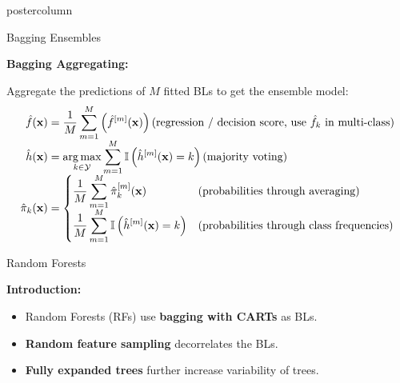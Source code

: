 \documentclass{beamer}
\begin{document}
\begin{frame}[fragile]{}
\begin{columns}
\begin{column}{.31\textwidth}
\begin{beamercolorbox}[center]{postercolumn}
\begin{minipage}{.98\textwidth}
{\begin{myblock}{Bagging Ensembles}
            \begin{codebox}
              \textbf{Bagging Aggregating: }
              \end{codebox}

            Aggregate the predictions of $M$ fitted BLs to get the ensemble model:
            \begin{align*}
              \hat{f}(\mathbf{x}) &= \frac{1}{M} \sum\limits_{m=1}^M \left(\hat{f}^{[m]}(\mathbf{x})\right) \text{(regression / decision score, use $\hat{f}_k$ in multi-class)} \\[-1ex]
              \hat{h}(\mathbf{x}) &= \mathop{\mathrm{arg\,max}}_{k \in \mathcal{Y}} \sum\limits_{m=1}^M \mathbb{I} \left(\hat{h}^{[m]}(\mathbf{x}) = k\right) \text{(majority voting)} \\[-1ex]
            \hat \pi_{k}(\mathbf{x}) &=
            \left\{
            \begin{aligned}
            & \frac{1}{M} \sum\limits_{m=1}^M \hat{\pi}_{k}^{[m]}(\mathbf{x}) && \text{(probabilities through averaging)} \\[-1ex]
            & \frac{1}{M} \sum\limits_{m=1}^M \mathbb{I} \left(\hat{h}^{[m]}(\mathbf{x}) = k \right) && \text{(probabilities through class frequencies)}
            \end{aligned}
            \right.
            \end{align*}

             \end{myblock}

             \begin{myblock}{Random Forests}
              \begin{codebox} \textbf{Introduction: }
              \end{codebox}
          
              \begin{itemize}[$\bullet$]     
                \setlength{\itemindent}{+.3in}
                \item Random Forests (RFs) use \textbf{bagging with CARTs} as BLs.
                \item \textbf{Random feature sampling} decorrelates the BLs.
                \item \textbf{Fully expanded trees} further increase variability of trees.
                \end{itemize}

              \end{myblock}
             
				}
			\end{minipage}
		\end{beamercolorbox}
	\end{column}
	


\end{columns}
\end{frame}
\end{document}
